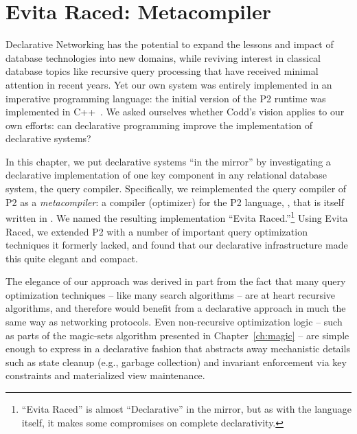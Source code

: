 \chapter[Evita Raced: Metacompiler]{Evita Raced: Metacompiler}
\label{ch:evita}

Declarative Networking has the potential to expand the lessons and impact of
database technologies into new domains, while reviving interest in classical
database topics like recursive query processing that have received minimal
attention in recent years.  Yet our own system was entirely implemented in an
imperative programming language: the initial version of the P2 runtime was
implemented in C++~\cite{p2:sosp}.  We asked ourselves whether Codd's vision
applies to our own efforts: can declarative programming improve the
implementation of declarative systems?

In this chapter, we put declarative systems ``in the mirror'' by investigating
a declarative implementation of one key component in any relational database
system, the query compiler.  Specifically, we reimplemented the query
compiler of P2 as a {\em metacompiler}: a compiler (optimizer) for the P2
language, \OVERLOG, that is itself written in \OVERLOG.  We named the resulting
implementation ``Evita Raced.''\footnote{``Evita Raced'' is almost
``Declarative'' in the mirror, but as with the \OVERLOG language itself, it
makes some compromises on complete declarativity.} Using Evita Raced, we
extended P2 with a number of important query optimization techniques it
formerly lacked, and found that our declarative infrastructure made this quite
elegant and compact.  

The elegance of our approach was derived in part from the fact that many query
optimization techniques -- like many search algorithms -- are at heart
recursive algorithms, and therefore would benefit from a declarative approach
in much the same way as networking protocols.  Even non-recursive optimization
logic -- such as parts of the magic-sets algorithm presented in
Chapter~\ref{ch:magic} -- are simple enough to express in a declarative fashion
that abstracts away mechanistic details such as state cleanup (e.g., garbage
collection) and invariant enforcement via key constraints and materialized view
maintenance.

